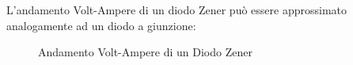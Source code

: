 \documentclass{article}
\numberwithin{equation}{subsection}
\begin{document}
L'andamento Volt-Ampere di un diodo Zener può essere approssimato analogamente ad un diodo a giunzione:
\begin{figure}[H]%
    \centering
    \qquad
    \caption{Andamento Volt-Ampere di un Diodo Zener}
    \label{fig:andamento-diodo-zener}
\end{figure}
\end{document}
